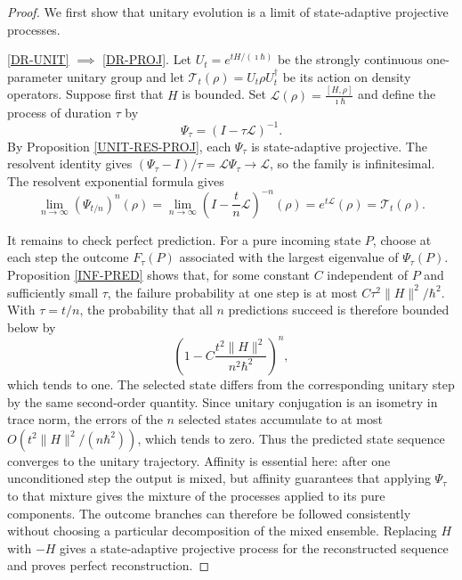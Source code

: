 \documentclass{techbrief}
\begin{document}
\begin{proof}
	We first show that unitary evolution is a limit of state-adaptive projective processes.

	\ref{DR-UNIT} $\implies$ \ref{DR-PROJ}. Let $U_t=e^{tH/(\imath\hbar)}$ be the strongly continuous one-parameter unitary group and let $\mathcal{T}_t(\rho)=U_t\rho U_t^\dagger$ be its action on density operators. Suppose first that $H$ is bounded. Set $\mathcal{L}(\rho)=\frac{[H,\rho]}{\imath\hbar}$ and define the process of duration $\tau$ by
	\begin{equation}
		\Psi_\tau=(I-\tau\mathcal{L})^{-1}.
	\end{equation}
	By Proposition \ref{UNIT-RES-PROJ}, each $\Psi_\tau$ is state-adaptive projective. The resolvent identity gives $(\Psi_\tau-I)/\tau=\mathcal{L}\Psi_\tau\to\mathcal{L}$, so the family is infinitesimal. The resolvent exponential formula gives
	\begin{equation}\label{RES-LIMIT}
		\lim_{n\to\infty}\left(\Psi_{t/n}\right)^n(\rho)
		=\lim_{n\to\infty}\left(I-\frac{t}{n}\mathcal{L}\right)^{-n}(\rho)
		=e^{t\mathcal{L}}(\rho)
		=\mathcal{T}_t(\rho).
	\end{equation}

	It remains to check perfect prediction. For a pure incoming state $P$, choose at each step the outcome $F_\tau(P)$ associated with the largest eigenvalue of $\Psi_\tau(P)$. Proposition \ref{INF-PRED} shows that, for some constant $C$ independent of $P$ and sufficiently small $\tau$, the failure probability at one step is at most $C\tau^2\|H\|^2/\hbar^2$. With $\tau=t/n$, the probability that all $n$ predictions succeed is therefore bounded below by
	\begin{equation}
		\left(1-C\frac{t^2\|H\|^2}{n^2\hbar^2}\right)^n,
	\end{equation}
	which tends to one. The selected state differs from the corresponding unitary step by the same second-order quantity. Since unitary conjugation is an isometry in trace norm, the errors of the $n$ selected states accumulate to at most $O(t^2\|H\|^2/(n\hbar^2))$, which tends to zero. Thus the predicted state sequence converges to the unitary trajectory. Affinity is essential here: after one unconditioned step the output is mixed, but affinity guarantees that applying $\Psi_\tau$ to that mixture gives the mixture of the processes applied to its pure components. The outcome branches can therefore be followed consistently without choosing a particular decomposition of the mixed ensemble. Replacing $H$ with $-H$ gives a state-adaptive projective process for the reconstructed sequence and proves perfect reconstruction.


\end{proof}
\end{document}
